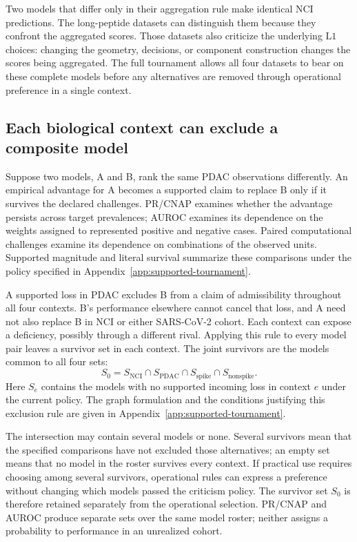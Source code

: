 \documentclass[11pt]{article}
\begin{document}
Two models that differ only in their aggregation rule make identical NCI
predictions. The long-peptide datasets can distinguish them because they
confront the aggregated scores. Those datasets also criticize the underlying
\(\mathrm{L1}\) choices: changing the geometry, decisions, or component
construction changes the scores being aggregated. The full tournament allows
all four datasets to bear on these complete models before any alternatives
are removed through operational preference in a single context.

\subsection{Each biological context can exclude a composite model}

Suppose two models, A and B, rank the same PDAC observations differently. An
empirical advantage for A becomes a supported claim to replace B only if it
survives the declared challenges. PR/CNAP examines whether the advantage
persists across target prevalences; AUROC examines its dependence on the
weights assigned to represented positive and negative cases. Paired
computational challenges examine its dependence on combinations of the
observed units. Supported magnitude and literal survival summarize these
comparisons under the policy specified in
Appendix~\ref{app:supported-tournament}.

A supported loss in PDAC excludes B from a claim of admissibility throughout
all four contexts. B's performance elsewhere cannot cancel that loss, and A
need not also replace B in NCI or either SARS-CoV-2 cohort. Each context can
expose a deficiency, possibly through a different rival. Applying this rule to
every model pair leaves a survivor set in each context. The joint survivors
are the models common to all four sets:
\begin{equation}
S_0=S_{\mathrm{NCI}}\cap S_{\mathrm{PDAC}}
\cap S_{\mathrm{spike}}\cap S_{\mathrm{nonspike}}.
\label{eq:joint_admissibility}
\end{equation}
Here \(S_e\) contains the models with no supported incoming loss in context
\(e\) under the current policy. The graph formulation and the conditions
justifying this exclusion rule are given in
Appendix~\ref{app:supported-tournament}.

The intersection may contain several models or none. Several survivors mean
that the specified comparisons have not excluded those alternatives; an empty
set means that no model in the roster survives every context. If practical use
requires choosing among several survivors, operational rules can express a
preference without changing which models passed the criticism policy. The
survivor set \(S_0\) is therefore retained separately from the operational
selection. PR/CNAP and AUROC produce separate sets over the same model roster;
neither assigns a probability to performance in an unrealized cohort.
\end{document}
